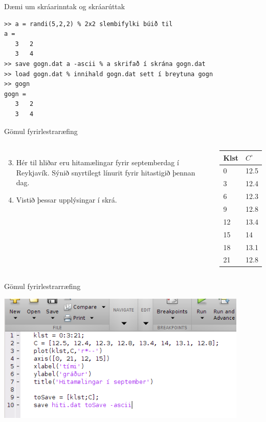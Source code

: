 \documentclass{beamer}
\begin{document}
\begin{frame}[fragile]{Dæmi um skráarinntak og skráarúttak}
\begin{verbatim}
>> a = randi(5,2,2) % 2x2 slembifylki búið til
a =
   3   2
   3   4
>> save gogn.dat a -ascii % a skrifað í skrána gogn.dat
>> load gogn.dat % innihald gogn.dat sett í breytuna gogn
>> gogn
gogn =
   3   2
   3   4
\end{verbatim}
\end{frame}


\begin{frame}{Gömul fyrirlestraræfing}
\begin{columns}
\begin{enumerate}
\setcounter{enumi}{2}
 \item Hér til hliðar eru hitamælingar fyrir septemberdag í Reykjavík. Sýnið snyrtilegt línurit fyrir hitastigið þennan dag.
 \item Vistið þessar upplýsingar í skrá.
\end{enumerate}
\begin{center}
\begin{tabular}{ll}
\toprule
Klst&$C^\circ$\\
\midrule
0&12.5\\
3&12.4\\
6&12.3\\
9&12.8\\
12&13.4\\
15&14\\
18&13.1\\
21&12.8\\
\bottomrule
\end{tabular}
\end{center}
\end{columns}
\end{frame}

\begin{frame}[fragile]{Gömul fyrirlestrarræfing}
\begin{center}
\includegraphics[width=0.9\textwidth]{../Pics/septemberhitiscript}
\end{center}
\end{frame}
\end{document}
